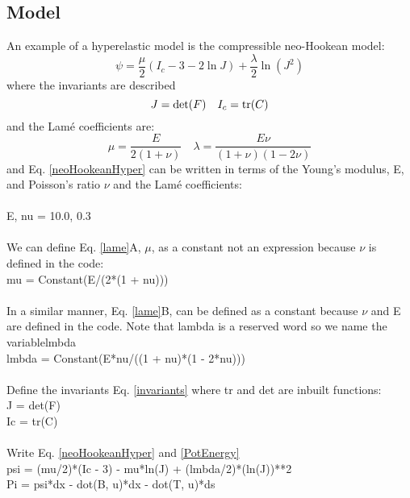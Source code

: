 \documentclass[12pt,3p]{article}
\begin{document}
\subsection{Model}
An example of a hyperelastic model is the compressible neo-Hookean model:
\begin{equation}\label{neoHookeanHyper}
\psi = \frac{\mu}{2} (I_c - 3 - 2 \ln J ) + \frac{\lambda}{2} \ln (J^2)
\end{equation}
where the invariants are described 
\begin{equation}\label{invariants}
J = \det(F) \quad I_c = \trace(C)
\end{equation}
and the Lamé coefficients are: 
\begin{equation}\label{lame}
\mu = \frac{E}{2 (1 + \nu)} \quad \lambda = \frac{E \nu}{(1+ \nu) (1 - 2 \nu)} 
\end{equation}
and Eq. \ref{neoHookeanHyper} can be written in terms of the Young's modulus, E, and Poisson's ratio $\nu$ and the Lamé coefficients: \\ \\
{\selectfont
E, nu = 10.0, 0.3 \\ \\
}
We can define Eq. \ref{lame}A, $\mu$, as a constant not an expression because $\nu$ is defined in the code: \\
{\selectfont
mu = Constant(E/(2*(1 + nu))) \\ \\ 
}
In a similar manner, Eq. \ref{lame}B, can be defined as a constant because $\nu$ and E are defined in the code. Note that {\selectfont lambda} is a reserved word so we name the variable{\selectfont lmbda } \\
{\selectfont
lmbda = Constant(E*nu/((1 + nu)*(1 - 2*nu)))  \\ \\ 
}
Define the invariants Eq. \ref{invariants} where {\selectfont tr} and {\selectfont det} are inbuilt functions: \\
{\selectfont
J  = det(F) \\
Ic = tr(C) \\ \\ 
}
Write Eq. \ref{neoHookeanHyper} and \ref{PotEnergy}  \\
{\selectfont
psi = (mu/2)*(Ic - 3) - mu*ln(J) + (lmbda/2)*(ln(J))**2 \\ 
Pi = psi*dx - dot(B, u)*dx - dot(T, u)*ds 
}
\end{document}
